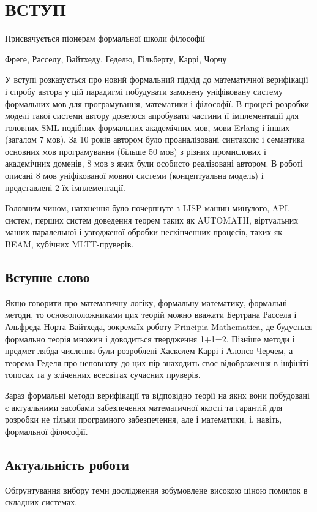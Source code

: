 \chapter*{ВСТУП}
\epigraph{Присвячується піонерам формальної школи філософії}
         {Фреге, Расселу, Вайтхеду, Геделю, Гільберту, Каррі, Чорчу}

У вступі розказується про новий формальний підхід до математичної верифікації і спробу автора
у цій парадигмі побудувати замкнену уніфіковану систему формальних мов для
програмування, математики і філософії. В процесі розробки моделі такої системи автору
довелося апробувати частини її імплементації для головних SML-подібних формальних академічних мов,
мови Erlang і інших (загалом 7 мов). За 10 років автором було проаналізовані
синтаксис і семантика основних мов програмування (більше 50 мов) з різних промислових
і академічних доменів, 8 мов з яких були особисто реалізовані автором. В роботі
описані 8 мов уніфікованої мовної системи (концептуальна модель) і представлені 2 їх імплементації.

Головним чином, натхнення було почерпнуте з LISP-машин минулого, APL-систем,
перших систем доведення теорем таких як AUTOMATH, віртуальних маших паралельної
і узгодженої обробки нескінченних процесів, таких як BEAM, кубічних MLTT-пруверів.

\section*{Вступне слово}
Якщо говорити про математичну логіку, формальну математику, формальні методи,
то основоположниками цих теорій можно вважати Бертрана Рассела і Альфреда Норта Вайтхеда, зокремаїх роботу
Principia Mathematica, де будується формально теорія множин і доводиться твердження 1+1=2. Пізніше методи і предмет
лябда-числення були розроблені Хаскелем Каррі і Алонсо Черчем, а теорема Геделя про неповноту до цих пір
знаходить своє відображення в інфініті-топосах та у зліченних всесвітах сучасних пруверів.

Зараз формальні методи верифікації та відповідно теорії на яких вони побудовані
є актуальними засобами забезпечення математичної якості та гарантій для розробки не тільки
програмного забезпечення, але і математики, і, навіть, формальної філософії.

\section{Актуальність роботи}
Обґрунтування вибору теми дослідження зобумовлене високою ціною помилок в складних системах.

